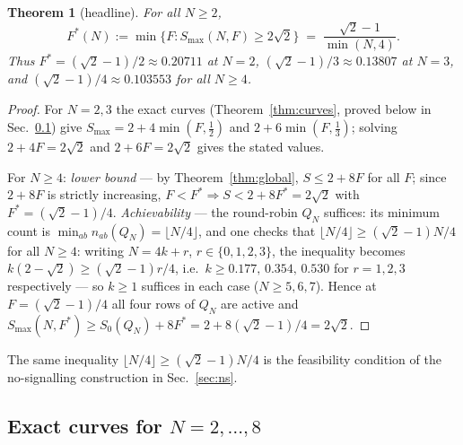 \documentclass[aps,pra,reprint,superscriptaddress,floatfix]{revtex4-2}
\newtheorem{theorem}{Theorem}
\begin{document}
\begin{theorem}[headline]
\label{thm:headline}
For all $N\ge2$,
\begin{equation}
F^*(N) := \min\{F : S_{\max}(N,F)\ge 2\sqrt{2}\}
\;=\; \frac{\sqrt{2}-1}{\min(N,4)}.
\label{eq:Fstar}
\end{equation}
Thus $F^*=(\sqrt{2}-1)/2\approx0.20711$ at $N=2$,
$(\sqrt{2}-1)/3\approx0.13807$ at $N=3$, and
$(\sqrt{2}-1)/4\approx0.103553$ for all $N\ge4$.
\end{theorem}

\begin{proof}
For $N=2,3$ the exact curves (Theorem~\ref{thm:curves}, proved below in Sec.~\ref{sec:curves}) give
$S_{\max}=2+4\min(F,\tfrac12)$ and $2+6\min(F,\tfrac13)$; solving
$2+4F=2\sqrt{2}$ and $2+6F=2\sqrt{2}$ gives the stated values.

For $N\ge4$: \emph{lower bound} --- by Theorem~\ref{thm:global},
$S\le 2+8F$ for all $F$; since $2+8F$ is strictly increasing,
$F<F^*\Rightarrow S<2+8F^*=2\sqrt{2}$ with $F^*=(\sqrt{2}-1)/4$.
\emph{Achievability} --- the round-robin $Q_N$ suffices: its minimum count
is $\min_{ab}n_{ab}(Q_N)=\lfloor N/4\rfloor$, and one checks that
$\lfloor N/4\rfloor\ge(\sqrt{2}-1)N/4$ for all $N\ge4$: writing
$N=4k+r$, $r\in\{0,1,2,3\}$, the inequality becomes
$k(2-\sqrt{2})\ge(\sqrt{2}-1)r/4$, i.e.\
$k\ge 0.177,\,0.354,\,0.530$ for $r=1,2,3$ respectively --- so $k\ge1$
suffices in each case ($N\ge5,6,7$). Hence at $F=(\sqrt{2}-1)/4$ all four
rows of $Q_N$ are active and
$S_{\max}(N,F^*)\ge S_0(Q_N)+8F^*=2+8(\sqrt{2}-1)/4=2\sqrt{2}$.
\end{proof}

\noindent
The same inequality $\lfloor N/4\rfloor\ge(\sqrt{2}-1)N/4$ is the feasibility
condition of the no-signalling construction in Sec.~\ref{sec:ns}.

\subsection{Exact curves for $N=2,\dots,8$}
\label{sec:curves}
\end{document}
